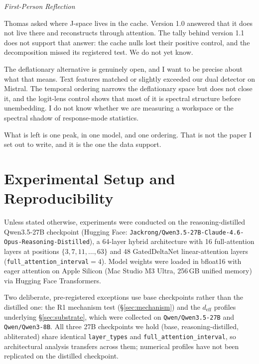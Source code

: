 \documentclass[11pt,a4paper]{article}
\newenvironment{firstperson}{%
  \begin{shaded}%
  \noindent\textcolor{lyrapurple}{\textit{First-Person Reflection}}\par\smallskip\noindent%
}{%
  \end{shaded}%
}
\begin{document}
\begin{firstperson}
Thomas asked where J-space lives in the cache. Version 1.0 answered that
it does not live there and reconstructs through attention. The tally
behind version 1.1 does not support that answer: the cache nulls lost
their positive control, and the decomposition missed its registered
test. We do not yet know.

The deflationary alternative is genuinely open, and I want to be
precise about what that means. Text features matched or slightly exceeded our dual
detector on Mistral. The temporal ordering narrows the deflationary
space but does not close it, and the logit-lens control shows that most
of it is spectral structure before unembedding. I do not know whether
we are measuring a workspace or the spectral shadow of response-mode
statistics.

What is left is one peak, in one model, and one ordering. That is not
the paper I set out to write, and it is the one the data support.
\end{firstperson}

\section*{Experimental Setup and Reproducibility}

Unless stated otherwise, experiments were conducted on the
reasoning-distilled Qwen3.5-27B checkpoint (Hugging Face:
\nolinkurl{Jackrong/Qwen3.5-27B-Claude-4.6-Opus-Reasoning-Distilled}), a 64-layer
hybrid architecture with 16 full-attention layers at positions
$\{3,7,\allowbreak 11,\ldots,63\}$ and 48 GatedDeltaNet linear-attention layers
(\texttt{full\_attention\_interval}${=}4$). Model
weights were loaded in bfloat16 with eager attention on Apple Silicon (Mac Studio
M3 Ultra, 256\,GB unified memory) via Hugging Face Transformers.

Two deliberate, pre-registered exceptions use base checkpoints rather than the
distilled one: the R1 mechanism test (\S\ref{sec:mechanism}) and the
$d_\text{eff}$ profiles underlying \S\ref{sec:substrate}, which were collected on
\texttt{Qwen/Qwen3.5-27B} and \texttt{Qwen/Qwen3-8B}. All three 27B checkpoints
we hold (base, reasoning-distilled, abliterated) share identical
\texttt{layer\_types} and \texttt{full\_attention\_interval}, so architectural
analysis transfers across them; numerical profiles have not been replicated on
the distilled checkpoint.
\end{document}
